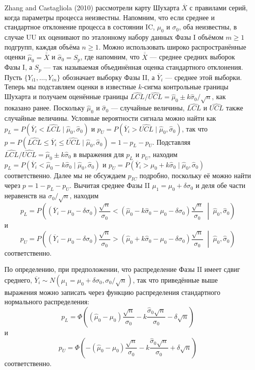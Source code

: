 Zhang and Castagliola (2010) рассмотрели карту Шухарта \(\overline{X}\) с правилами серий, когда параметры процесса неизвестны. Напомним, что если среднее и стандартное отклонение процесса в состоянии IC, \(\mu_0\) и \(\sigma_0\), оба неизвестны, в случае UU их оценивают по эталонному набору данных Фазы I объёмом \(m \ge 1\) подгрупп, каждая объёма \(n \ge 1\). Можно использовать широко распространённые оценки \(\hat{\mu}_0 = \overline{\overline{X}}\) и \(\hat{\sigma}_0 = S_p\), где напомним, что \(\overline{\overline{X}}\) — среднее средних выборок Фазы I, а \(S_p\) — так называемая объединённая оценка стандартного отклонения. Пусть \(\{Y_{i1}, \ldots, Y_{in}\}\) обозначает выборку Фазы II, а \(\overline{Y}_i\) — среднее этой выборки. Теперь мы подставляем оценки в известные \(k\)-сигма контрольные границы Шухарта и получаем оценённые границы \(\widehat{LCL}/\widehat{UCL} = \hat{\mu}_0 \pm k\hat{\sigma}_0/\sqrt{n}\), как показано ранее. Поскольку \(\hat{\mu}_0\) и \(\hat{\sigma}_0\) — случайные величины, \(\widehat{LCL}\) и \(\widehat{UCL}\) также случайные величины. Условные вероятности сигнала можно найти как \(p_L = P(\overline{Y}_i < \widehat{LCL} \mid \hat{\mu}_0, \hat{\sigma}_0)\) и \(p_U = P(\overline{Y}_i > \widehat{UCL} \mid \hat{\mu}_0, \hat{\sigma}_0)\), так что \(p = P(\widehat{LCL} \le \overline{Y}_i \le \widehat{UCL} \mid \hat{\mu}_0, \hat{\sigma}_0) = 1 - p_L - p_U\). Подставляя \(\widehat{LCL}/\widehat{UCL} = \hat{\mu}_0 \pm k\hat{\sigma}_0\) в выражения для \(p_L\) и \(p_U\), находим \(p_L = P(\overline{Y}_i < \hat{\mu}_0 - k\hat{\sigma}_0 \mid \hat{\mu}_0, \hat{\sigma}_0)\) и \(p_U = P(\overline{Y}_i > \hat{\mu}_0 + k\hat{\sigma}_0 \mid \hat{\mu}_0, \hat{\sigma}_0)\) соответственно. Далее мы не обсуждаем \(p_{IC}\) подробно, поскольку её можно найти через \(p = 1 - p_L - p_U\). Вычитая среднее Фазы II \(\mu_1 = \mu_0 + \delta\sigma_0\) и деля обе части неравенств на \(\sigma_0/\sqrt{n}\), находим
\[
	p_L = P\left((\overline{Y}_i - \mu_0 - \delta\sigma_0)\frac{\sqrt{n}}{\sigma_0}
	< (\hat{\mu}_0 - k\hat{\sigma}_0 - \mu_0 - \delta\sigma_0)\frac{\sqrt{n}}{\sigma_0}
	\;\middle|\; \hat{\mu}_0, \hat{\sigma}_0\right)
\]
и
\[
	p_U = P\left((\overline{Y}_i - \mu_0 - \delta\sigma_0)\frac{\sqrt{n}}{\sigma_0}
	> (\hat{\mu}_0 + k\hat{\sigma}_0 - \mu_0 - \delta\sigma_0)\frac{\sqrt{n}}{\sigma_0}
	\;\middle|\; \hat{\mu}_0, \hat{\sigma}_0\right)
\]
соответственно.

По определению, при предположении, что распределение Фазы II имеет сдвиг среднего, \(\overline{Y}_i \sim N(\mu_1 = \mu_0 + \delta\sigma_0, \sigma_0/\sqrt{n})\), так что приведённые выше выражения можно записать через функцию распределения стандартного нормального распределения:
\[
	p_L = \Phi\left((\hat{\mu}_0 - \mu_0)\frac{\sqrt{n}}{\sigma_0} - k\frac{\hat{\sigma}_0\sqrt{n}}{\sigma_0} - \delta\sqrt{n}\right)
\]
и
\[
	p_U = \Phi\left(-(\hat{\mu}_0 - \mu_0)\frac{\sqrt{n}}{\sigma_0} - k\frac{\hat{\sigma}_0\sqrt{n}}{\sigma_0} + \delta\sqrt{n}\right)
\]
соответственно.

